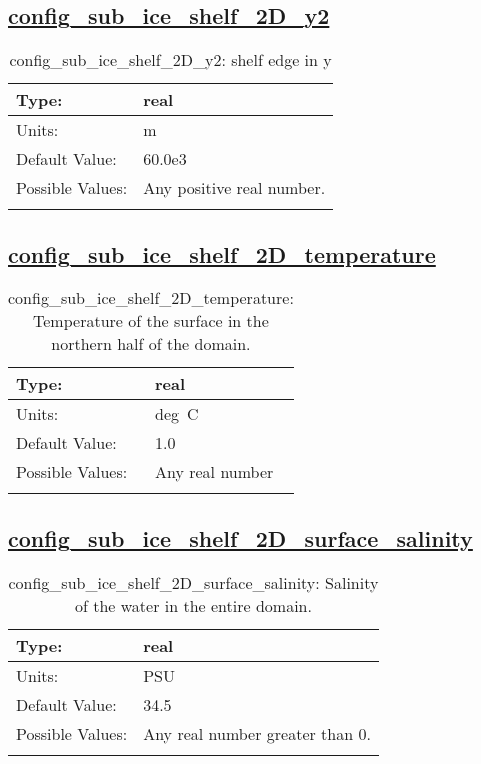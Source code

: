 \subsection[config\_sub\_ice\_shelf\_2D\_y2]{\hyperref[sec:nm_tab_sub_ice_shelf_2D]{config\_sub\_ice\_shelf\_2D\_y2}}
\label{subsec:nm_sec_config_sub_ice_shelf_2D_y2}
\begin{center}
\begin{longtable}{| p{2.0in} || p{4.0in} |}
    \hline
    Type: & real \\
    \hline
    Units: & \si{m} \\
    \hline
    Default Value: & 60.0e3 \\
    \hline
    Possible Values: & Any positive real number. \\
    \hline
    \caption{config\_sub\_ice\_shelf\_2D\_y2: shelf edge in y}
\end{longtable}
\end{center}
\subsection[config\_sub\_ice\_shelf\_2D\_temperature]{\hyperref[sec:nm_tab_sub_ice_shelf_2D]{config\_sub\_ice\_shelf\_2D\_temperature}}
\label{subsec:nm_sec_config_sub_ice_shelf_2D_temperature}
\begin{center}
\begin{longtable}{| p{2.0in} || p{4.0in} |}
    \hline
    Type: & real \\
    \hline
    Units: & \si{deg.C} \\
    \hline
    Default Value: & 1.0 \\
    \hline
    Possible Values: & Any real number \\
    \hline
    \caption{config\_sub\_ice\_shelf\_2D\_temperature: Temperature of the surface in the northern half of the domain.}
\end{longtable}
\end{center}
\subsection[config\_sub\_ice\_shelf\_2D\_surface\_salinity]{\hyperref[sec:nm_tab_sub_ice_shelf_2D]{config\_sub\_ice\_shelf\_2D\_surface\_salinity}}
\label{subsec:nm_sec_config_sub_ice_shelf_2D_surface_salinity}
\begin{center}
\begin{longtable}{| p{2.0in} || p{4.0in} |}
    \hline
    Type: & real \\
    \hline
    Units: & \si{PSU} \\
    \hline
    Default Value: & 34.5 \\
    \hline
    Possible Values: & Any real number greater than 0. \\
    \hline
    \caption{config\_sub\_ice\_shelf\_2D\_surface\_salinity: Salinity of the water in the entire domain.}
\end{longtable}
\end{center}
